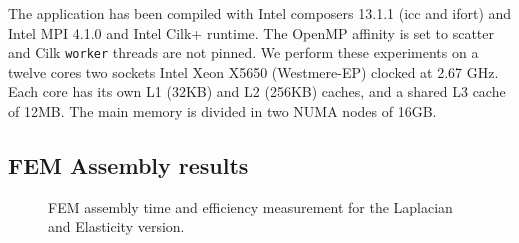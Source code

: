 \documentclass[10pt]{IOS-Book-Article}
\begin{document}
The application has been compiled with Intel composers 13.1.1 (icc and ifort) and Intel MPI 4.1.0 and Intel Cilk+ runtime.
The OpenMP affinity is set to scatter and Cilk {\tt worker} threads are not pinned.
We perform these experiments on a twelve cores two sockets Intel Xeon X5650 (Westmere-EP) clocked at 2.67 GHz.
Each core has its own L1 (32KB) and L2 (256KB) caches, and a shared L3 cache of 12MB. The main memory is divided in two NUMA nodes of 16GB.

\subsection{FEM Assembly results}
\begin{figure}[htp]
 \caption{FEM assembly time and efficiency measurement for the Laplacian and Elasticity version.}
 \label{fig:asmCurves}
\end{figure}
\end{document}
